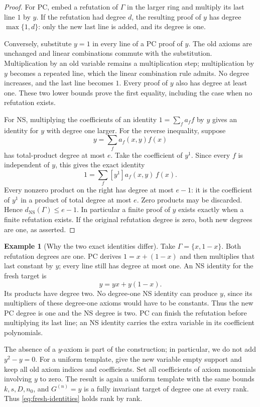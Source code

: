 \documentclass[11pt,a4paper]{article}
\theoremstyle{definition}\newtheorem{definition}[theorem]{Definition}
\newtheorem{example}[theorem]{Example}
\theoremstyle{remark}\newtheorem{remark}[theorem]{Remark}
\newcommand{\NS}{\mathrm{NS}}\newcommand{\PC}{\mathrm{PC}}
\begin{document}
\begin{proof}
For PC, embed a refutation of $\Gamma$ in the larger ring and multiply
its last line $1$ by $y$. If the refutation had degree $d$, the resulting
proof of $y$ has degree $\max\{1,d\}$: only the new last line is added,
and its degree is one.

Conversely, substitute $y=1$ in every line of a PC proof of $y$.
The old axioms are unchanged and linear combinations commute with the
substitution. Multiplication by an old variable remains a multiplication
step; multiplication by $y$ becomes a repeated line, which the linear
combination rule admits. No degree increases, and the last line becomes
$1$. Every proof of $y$ also has degree at least one. These two lower
bounds prove the first equality, including the case when no refutation
exists.

For NS, multiplying the coefficients of an identity
$1=\sum_fa_ff$ by $y$ gives an identity for $y$ with degree one larger.
For the reverse inequality, suppose
\[
                    y=\sum_f a_f(x,y)f(x)
\]
has total-product degree at most $e$. Take the coefficient of $y^1$.
Since every $f$ is independent of $y$, this gives the exact identity
\[
                    1=\sum_f [y^1]a_f(x,y)\,f(x).
\]
Every nonzero product on the right has degree at most $e-1$: it is the
coefficient of $y^1$ in a product of total degree at most $e$. Zero
products may be discarded. Hence $d_{\NS}(\Gamma)\le e-1$.
In particular a finite proof of $y$ exists exactly when a finite
refutation exists. If the original refutation degree is zero, both
new degrees are one, as asserted.
\end{proof}

\begin{example}[Why the two exact identities differ]
Take $\Gamma=\{x,1-x\}$. Both refutation degrees are one. PC derives
$1=x+(1-x)$ and then multiplies that last constant by $y$; every line
still has degree at most one. An NS identity for the fresh target is
\[
                             y=yx+y(1-x).
\]
Its products have degree two. No degree-one NS identity can produce
$y$, since its multipliers of these degree-one axioms would have to
be constants. Thus the new PC degree is one and the NS degree is two.
PC can finish the refutation before multiplying its last line; an NS
identity carries the extra variable in its coefficient polynomials.
\end{example}

The absence of a $y$-axiom is part of the construction; in particular,
we do not add $y^2-y=0$. For a uniform template, give the new variable
empty support and keep all old axiom indices and coefficients. Set
all coefficients of axiom monomials involving $y$ to zero. The result
is again a uniform template with the same bounds $k,s,D,n_0$, and
$G^{(n)}=y$ is a fully invariant target of degree one at every rank.
Thus \eqref{eq:fresh-identities} holds rank by rank.
\end{document}
